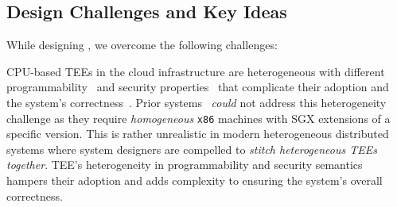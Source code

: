 \subsection{Design Challenges and Key Ideas} \label{subsec:challenges} While designing \projecttitle{}, we overcome the following challenges:

CPU-based TEEs in the cloud infrastructure are heterogeneous with different programmability~\cite{Baumann2014, scone, 10.1145/3079856.3080208, 10.1145/3460120.3485341, tsai2017graphene, Rkt-io} and security properties~\cite{10.1145/3600160.3600169, 7807249, 10.1007/978-3-031-16092-9_7} that complicate their adoption and the system's correctness~\cite{10.1145/3460120.3485341}. 
Prior systems~\cite{hybster, 10.1145/3492321.3519568, minBFT, DBLP:journals/corr/LiuLKA16a} {\em could} not address this heterogeneity challenge as they require {\em homogeneous} {\tt x86} machines with SGX extensions of a specific version. This is rather unrealistic in modern heterogeneous distributed systems where system designers are compelled to {\em stitch heterogeneous TEEs together}. TEE's heterogeneity in programmability and security semantics hampers their adoption and adds complexity to ensuring the system's overall correctness. 


